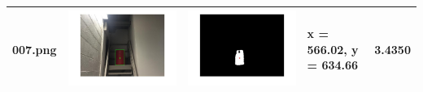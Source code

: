\documentclass[fleqn,10pt]{SelfArx} %
\begin{document}
\begin{table}
\begin{tabular}{>{\centering\arraybackslash}M{15mm}cc>{\centering\arraybackslash}M{11mm}>{\centering\arraybackslash}M{15mm}}
\vspace{-4cm}007.png & \includegraphics[trim={3cm 2cm 3cm 2cm},clip,scale=0.28]{results/007.jpg} & \includegraphics[trim={3cm 2cm 3cm 2cm},clip,scale=0.28]{results/007s.jpg} & \vspace{-4cm} x = 566.02, y = 634.66 & \vspace{-4cm}3.4350 \\ 
\hline 

\end{tabular}
\end{table}
\end{document}
